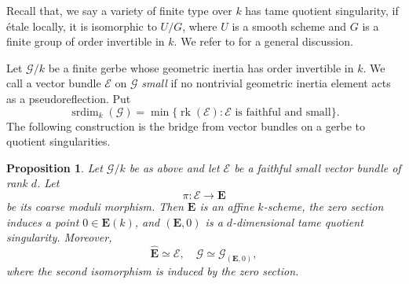 \documentclass[11pt,reqno]{amsart}
\numberwithin{equation}{section}
\theoremstyle{plain}
\newtheorem{prop}{Proposition}[section]
\theoremstyle{definition}
\def\cG{{\mathcal G}}
\def\cE{{\mathcal E}}
\def\bfE{{\mathbf E}}
\def\rk{{\operatorname{rk}}}
\begin{document}
Recall that, we say a variety of finite type over $k$ has tame quotient singularity, if \'etale locally, it is isomorphic to $U/G$, where $U$ is a smooth scheme and $G$ is a finite group of order invertible in $k$. We refer to \cite[\S 6]{Bresciani_Vistoli_2024} for a general discussion.

Let $\cG/k$ be a finite gerbe whose geometric inertia has order invertible in
$k$. We call a vector bundle $\cE$ on $\cG$ \emph{small} if no nontrivial geometric inertia element acts as
a pseudoreflection. Put
\[
\operatorname{srdim}_k(\cG)
=
\min\{\rk(\cE):\cE\text{ is faithful and small}\}.
\]
The following construction is the bridge from vector bundles on a gerbe to
quotient singularities.

\begin{prop}\label{prop:gerbe-to-quotient-singularity}
Let $\cG/k$ be as above and let $\cE$ be a faithful small vector bundle of
rank $d$.  Let
\[
\pi:\cE\rightarrow \bfE
\]
be its coarse moduli morphism.  Then $\bfE$ is an affine $k$-scheme, the zero
section induces a point $0\in\bfE(k)$, and $(\bfE,0)$ is a $d$-dimensional
tame quotient singularity.  Moreover,
\[
\widehat{\bfE}\simeq \cE,
\quad
\cG\simeq\cG_{(\bfE,0)},
\]
where the second isomorphism is induced by the zero section.
\end{prop}
\end{document}
